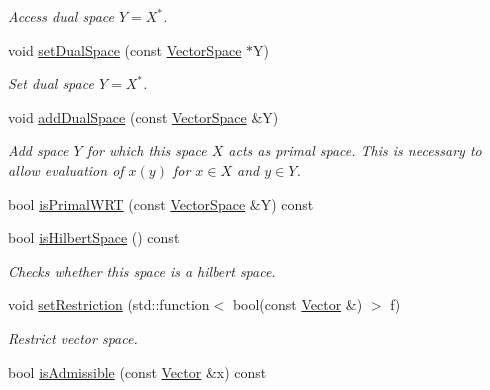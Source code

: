 \begin{DoxyCompactItemize}
\begin{DoxyCompactList}\small\item\em Access dual space $Y=X^*$. \end{DoxyCompactList}\item 
\hypertarget{classSpacy_1_1VectorSpace_a22d977f8e7239de59f9c5abffdaa6b3d}{void \hyperlink{classSpacy_1_1VectorSpace_a22d977f8e7239de59f9c5abffdaa6b3d}{set\-Dual\-Space} (const \hyperlink{classSpacy_1_1VectorSpace}{Vector\-Space} $\ast$Y)}\label{classSpacy_1_1VectorSpace_a22d977f8e7239de59f9c5abffdaa6b3d}

\begin{DoxyCompactList}\small\item\em Set dual space $Y=X^*$. \end{DoxyCompactList}\item 
\hypertarget{classSpacy_1_1VectorSpace_a6477c132f76235270db33fa85b13acd9}{void \hyperlink{classSpacy_1_1VectorSpace_a6477c132f76235270db33fa85b13acd9}{add\-Dual\-Space} (const \hyperlink{classSpacy_1_1VectorSpace}{Vector\-Space} \&Y)}\label{classSpacy_1_1VectorSpace_a6477c132f76235270db33fa85b13acd9}

\begin{DoxyCompactList}\small\item\em Add space $Y$ for which this space $X$ acts as primal space. This is necessary to allow evaluation of $x(y)$ for $ x\in X $ and $ y\in Y$. \end{DoxyCompactList}\item 
bool \hyperlink{classSpacy_1_1VectorSpace_aae96ebd6f5e4a1a95ab8684b49062e7d}{is\-Primal\-W\-R\-T} (const \hyperlink{classSpacy_1_1VectorSpace}{Vector\-Space} \&Y) const 
\item 
\hypertarget{classSpacy_1_1VectorSpace_a12b023eff0cce202e4a5f9a754cc05c9}{bool \hyperlink{classSpacy_1_1VectorSpace_a12b023eff0cce202e4a5f9a754cc05c9}{is\-Hilbert\-Space} () const }\label{classSpacy_1_1VectorSpace_a12b023eff0cce202e4a5f9a754cc05c9}

\begin{DoxyCompactList}\small\item\em Checks whether this space is a hilbert space. \end{DoxyCompactList}\item 
void \hyperlink{classSpacy_1_1VectorSpace_aa7d27ee5688a8e4ede54dec0cc9fda57}{set\-Restriction} (std\-::function$<$ bool(const \hyperlink{classSpacy_1_1Vector}{Vector} \&) $>$ f)
\begin{DoxyCompactList}\small\item\em Restrict vector space. \end{DoxyCompactList}\item 
\hypertarget{classSpacy_1_1VectorSpace_a4beac78b082a364eb97e938b6c4928d2}{bool \hyperlink{classSpacy_1_1VectorSpace_a4beac78b082a364eb97e938b6c4928d2}{is\-Admissible} (const \hyperlink{classSpacy_1_1Vector}{Vector} \&x) const }\label{classSpacy_1_1VectorSpace_a4beac78b082a364eb97e938b6c4928d2}


\end{DoxyCompactItemize}
